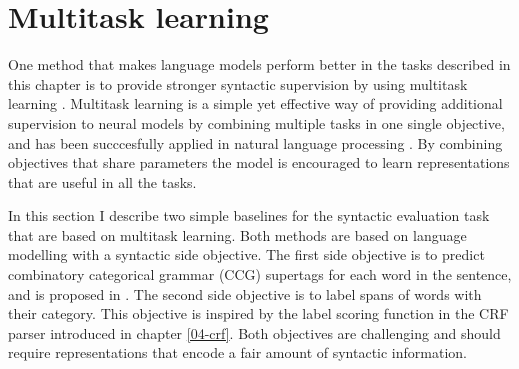 \section{Multitask learning}
One method that makes language models perform better in the tasks described in this chapter is to provide stronger syntactic supervision by using multitask learning \citep{enguehard2017multitask,linzen2018targeted}. Multitask learning is a simple yet effective way of providing additional supervision to neural models by combining multiple tasks in one single objective, and has been succcesfully applied in natural language processing \cite{collobert2008unified,collobert2011natural,zhang2016multitask,goldberg2016multitask}. By combining objectives that share parameters the model is encouraged to learn representations that are useful in all the tasks.

In this section I describe two simple baselines for the syntactic evaluation task that are based on multitask learning. Both methods are based on language modelling with a syntactic side objective. The first side objective is to predict combinatory categorical grammar (CCG) supertags \citep{bangalore1999supertagging} for each word in the sentence, and is proposed in \citep{enguehard2017multitask}. The second side objective is to label spans of words with their category. This objective is inspired by the label scoring function in the CRF parser introduced in chapter \ref{04-crf}. Both objectives are challenging and should require representations that encode a fair amount of syntactic information.


